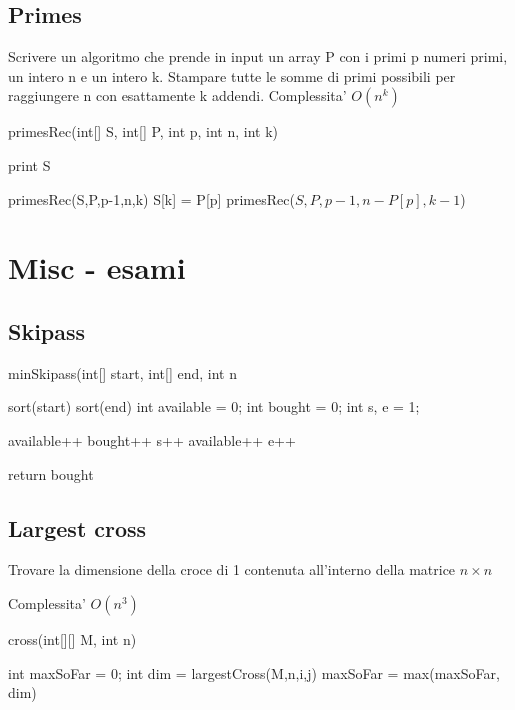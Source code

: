 \documentclass[oneside]{book}
\begin{document}
\section{Primes}
Scrivere un algoritmo che prende in input un array P con i primi p numeri primi, un intero n e un intero k. Stampare tutte le somme di primi possibili per raggiungere n con esattamente k addendi. 
Complessita' $O(n^k)$

\begin{algorithm}
\caption{primesRec(int[] S, int[] P, int p, int n, int k)\label{alg:cap}}
\begin{algorithmic}
	\State print S
\EndIf

	\State primesRec(S,P,p-1,n,k)
	\State S[k] = P[p]
	\State primesRec($S,P,p-1,n-P[p],k-1$)
\EndIf
\end{algorithmic}
\end{algorithm}
\chapter{Misc - esami}

\section{Skipass}
\begin{algorithm}
\caption{minSkipass(int[] start, int[] end, int n}
\begin{algorithmic}
\State sort(start)
\State sort(end)
\State int available = 0;
\State int bought = 0;
\State int s, e = 1;

			\State available++
		\Else
			\State bought++	
		\EndIf
		\State s++
	\Else
		\State available++
		\State e++
	\EndIf

\EndWhile
\State return bought
\end{algorithmic}
\end{algorithm}

\section{Largest cross}
Trovare la dimensione della croce di 1 contenuta all'interno della matrice $n\times n$ 

Complessita' $O(n^3)$

\begin{algorithm}
\caption{cross(int[][] M, int n)\label{alg:cap}}
\begin{algorithmic}
\State int maxSoFar = 0;
			int dim = largestCross(M,n,i,j)
			maxSoFar = max(maxSoFar, dim)
		\EndIf
	\EndFor

\EndFor
\end{algorithmic}
\end{algorithm}
\end{document}
